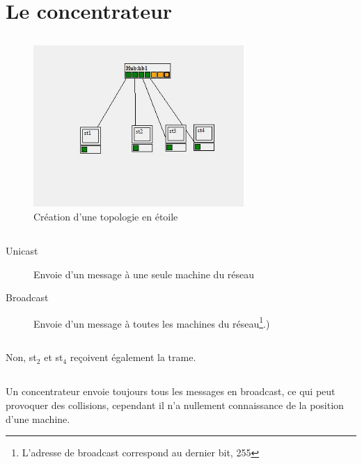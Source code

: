 \documentclass[a4paper, 11pt]{article}
\begin{document}
	\maketitle
	\section{Le concentrateur}
		\subsection{}
		\begin{figure}[H]
			\centering
			\includegraphics[width=8cm]{1.jpg}
			\caption{Création d'une topologie en étoile}
		\end{figure}
		\subsection{}
		\begin{description}
			\item[Unicast] Envoie d'un message à une seule machine du réseau
			\item[Broadcast] Envoie d'un message à toutes les machines du
				réseau\footnote{L'adresse de broadcast correspond au dernier bit, 255}.)
		\end{description}
		\subsection{}
		Non, st$_2$ et st$_4$ reçoivent également la trame.
		\subsection{}
		Un concentrateur envoie toujours tous les messages en broadcast, ce qui peut provoquer
		des collisions, cependant il n'a nullement connaissance de la position d'une machine.
\end{document}
